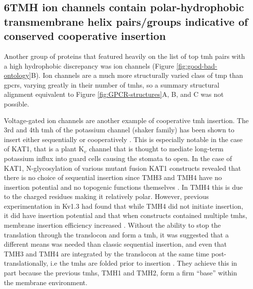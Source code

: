 \subsection{6TMH ion channels contain polar-hydrophobic transmembrane helix pairs/groups indicative of conserved cooperative insertion}

Another group of proteins that featured heavily on the list of top \gls{tmh} pairs with a high hydrophobic discrepancy was ion channels (Figure \ref{fig:good-bad-ontology}B).
Ion channels are a much more structurally varied class of \gls{tmp} than \gls{gpcr}s, varying greatly in their number of \gls{tmh}s, so a summary structural alignment equivalent to Figure \ref{fig:GPCR-structures}A, B, and C was not possible.

Voltage\--gated ion channels are another example of cooperative \gls{tmh} insertion.
The 3rd and 4th \gls{tmh} of the potassium channel (shaker family) has been shown to insert either sequentially or cooperatively \cite{Zhang2007, Cymer2015}.
This is especially notable in the case of KAT1, that is a plant K$_v$ channel that is thought to mediate long-term potassium influx into guard cells causing the stomata to open.
In the case of KAT1, N-glycosylation of various mutant fusion KAT1 constructs revealed that there is no choice of sequential insertion since TMH3 and TMH4 have no insertion potential and no topogenic functions themselves \cite{Sato2002, Sato2003}.
In TMH4 this is due to the charged residues making it relatively polar.
However, previous experimentation in Kv1.3 had found that while TMH4 did not initiate insertion, it did have insertion potential and that when constructs contained multiple \gls{tmh}s, membrane insertion efficiency increased \cite{Tu2000}.
Without the ability to stop the translation through the translocon and form a \gls{tmh}, it was suggested that a different means was needed than classic sequential insertion, and even that TMH3 and TMH4 are integrated by the translocon at the same time post-translationally, i.e the \gls{tmh}s are folded prior to insertion \cite{Sato2003}.
They achieve this in part because the previous \gls{tmh}s,  TMH1 and TMH2, form a firm ``base'' within the membrane environment.

